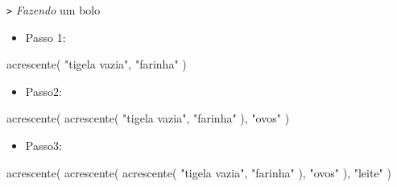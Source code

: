 \documentclass[
  10pt,
  ignorenonframetext,
]{beamer}
\newenvironment{Shaded}{\begin{snugshade}}{\end{snugshade}}
\newcommand{\FunctionTok}[1]{\textcolor[rgb]{0.28,0.35,0.67}{#1}}
\newcommand{\NormalTok}[1]{\textcolor[rgb]{0.00,0.23,0.31}{#1}}
\newcommand{\StringTok}[1]{\textcolor[rgb]{0.13,0.47,0.30}{#1}}
\providecommand{\tightlist}{%
  \setlength{\itemsep}{0pt}\setlength{\parskip}{0pt}}\usepackage{longtable,booktabs,array}
\begin{document}
\begin{frame}[fragile]{\texttt{\textbar{}\textgreater{}}
\newline \emph{Fazendo} um bolo}
\protect\hypertarget{fazendo-um-bolo-1}{}
\begin{itemize}
\tightlist
\item
  Passo 1:
\end{itemize}

\begin{Shaded}
\begin{Highlighting}[]
\FunctionTok{acrescente}\NormalTok{(}
  \StringTok{"tigela vazia"}\NormalTok{,}
  \StringTok{"farinha"}
\NormalTok{)}
\end{Highlighting}
\end{Shaded}

\begin{itemize}
\tightlist
\item
  Passo2:
\end{itemize}

\begin{Shaded}
\begin{Highlighting}[]
\FunctionTok{acrescente}\NormalTok{(}
  \FunctionTok{acrescente}\NormalTok{(}
    \StringTok{"tigela vazia"}\NormalTok{,}
    \StringTok{"farinha"}
\NormalTok{  ),}
  \StringTok{"ovos"}
\NormalTok{)}
\end{Highlighting}
\end{Shaded}
\end{frame}

\begin{frame}[fragile]
\begin{itemize}
\tightlist
\item
  Passo3:
\end{itemize}

\begin{Shaded}
\begin{Highlighting}[]
\FunctionTok{acrescente}\NormalTok{(}
  \FunctionTok{acrescente}\NormalTok{(}
    \FunctionTok{acrescente}\NormalTok{(}
      \StringTok{"tigela vazia"}\NormalTok{,}
      \StringTok{"farinha"}
\NormalTok{    ),}
    \StringTok{"ovos"}
\NormalTok{  ),}
  \StringTok{"leite"}
\NormalTok{)}
\end{Highlighting}
\end{Shaded}
\end{frame}
\end{document}
